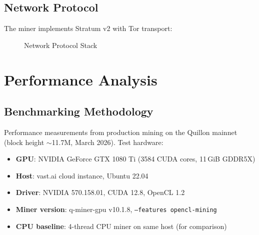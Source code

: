 \documentclass[11pt,a4paper]{article}
\begin{document}
\subsection{Network Protocol}

The miner implements Stratum v2 with Tor transport:

\begin{figure}[H]
\centering
{}
\caption{Network Protocol Stack}
\end{figure}

\section{Performance Analysis}

\subsection{Benchmarking Methodology}

Performance measurements from production mining on the Quillon mainnet (block height $\sim$11.7M, March 2026). Test hardware:
\begin{itemize}
    \item \textbf{GPU}: NVIDIA GeForce GTX 1080 Ti (3584 CUDA cores, 11\,GiB GDDR5X)
    \item \textbf{Host}: vast.ai cloud instance, Ubuntu 22.04
    \item \textbf{Driver}: NVIDIA 570.158.01, CUDA 12.8, OpenCL 1.2
    \item \textbf{Miner version}: q-miner-gpu v10.1.8, \texttt{--features opencl-mining}
    \item \textbf{CPU baseline}: 4-thread CPU miner on same host (for comparison)
\end{itemize}
\end{document}
